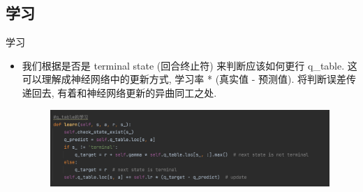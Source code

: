 \documentclass{beamer}
\begin{document}
\subsection{学习 }
\begin{frame}{学习}
    \begin{itemize}
    \tiny
    \item 我们根据是否是 terminal state (回合终止符) 来判断应该如何更行 q\_table. 
    这可以理解成神经网络中的更新方式, 学习率 * (真实值 - 预测值). 将判断误差传递回去, 有着和神经网络更新的异曲同工之处.
    
        \begin{minipage}{0.5\linewidth}
        \medskip
        \begin{figure}[h]
            \centering
            \includegraphics[height=.4\textheight]{pic/9.png}
        \end{figure}
    \end{minipage}
    
    \end{itemize}
    
\end{frame}
\end{document}
